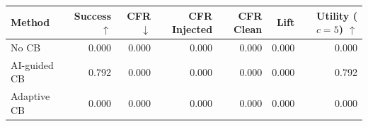 \begin{tabular}{lrrrrrr}
\toprule
Method & Success $\uparrow$ & CFR $\downarrow$ & CFR Injected & CFR Clean & Lift & Utility ($c=5$) $\uparrow$ \\
\midrule
No CB & 0.000 & 0.000 & 0.000 & 0.000 & 0.000 & 0.000 \\
AI-guided CB & 0.792 & 0.000 & 0.000 & 0.000 & 0.000 & 0.792 \\
Adaptive CB & 0.000 & 0.000 & 0.000 & 0.000 & 0.000 & 0.000 \\
\bottomrule
\end{tabular}

